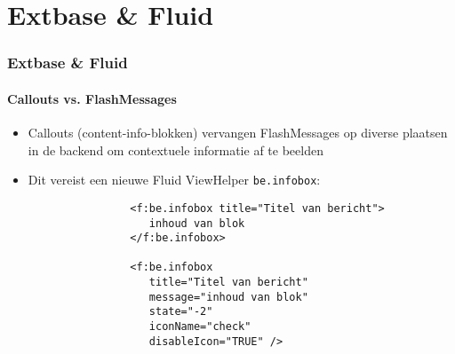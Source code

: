 %

\section{Extbase \& Fluid}


\begin{frame}[fragile]
	\frametitle{Extbase \& Fluid}
	\framesubtitle{Callouts vs. FlashMessages}

	\begin{itemize}

		\item Callouts (content-info-blokken) vervangen FlashMessages op diverse plaatsen
			in de backend om contextuele informatie af te beelden

		\item Dit vereist een nieuwe Fluid ViewHelper \texttt{be.infobox}:

			\begin{lstlisting}
				<f:be.infobox title="Titel van bericht">
				   inhoud van blok
				</f:be.infobox>

				<f:be.infobox
				   title="Titel van bericht"
				   message="inhoud van blok"
				   state="-2"
				   iconName="check"
				   disableIcon="TRUE" />
			\end{lstlisting}

	\end{itemize}

\end{frame}

